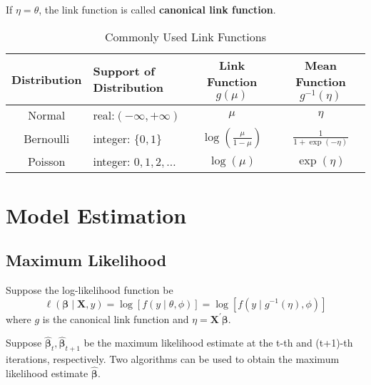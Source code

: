 \begin{remark}
    If $\eta=\theta$, the link function is called \textbf{canonical link function}.
\end{remark}


\begin{table}[hpt]
    \centering
    \caption{Commonly Used Link Functions}
    \begin{tabular}{clcc}
        \toprule
        Distribution & Support of Distribution  & Link Function $g(\mu)$               & Mean Function $g^{-1}(\eta)$ \\
        \midrule
        Normal       & real:$(-\infty,+\infty)$ & $\mu$                                & $\eta$                       \\
        Bernoulli    & integer: $\{0,1\}$       & $\log\left(\frac{\mu}{1-\mu}\right)$ & $\frac{1}{1+\exp(-\eta)}$    \\
        Poisson      & integer: $0,1,2,\ldots$  & $\log\left(\mu\right)$               & $\exp\left(\eta\right)$      \\
        \bottomrule
    \end{tabular}
\end{table}

\section{Model Estimation}

\subsection{Maximum Likelihood}

Suppose the log-likelihood function be
\begin{equation}
    \ell\left(\boldsymbol{\beta}\mid\mathbf{X},y\right)=\log\left[f\left(y\mid\theta,\phi\right)\right]=\log\left[f\left(y\mid g^{-1}(\eta),\phi\right)\right]
\end{equation}
where $g$ is the canonical link function and $\eta=\mathbf{X}^{\prime}\boldsymbol{\beta}$.

Suppose $\hat{\boldsymbol{\beta}}_{t},\hat{\boldsymbol{\beta}}_{t+1}$ be the maximum likelihood estimate at the t-th and (t+1)-th iterations, respectively. Two algorithms can be used to obtain the maximum likelihood estimate $\hat{\boldsymbol{\beta}}$.

